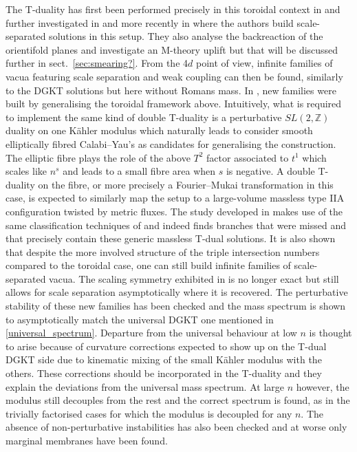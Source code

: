 \documentclass[11pt, a4paper]{article}
\newcommand{\Z}{\mathbb{Z}}
\begin{document}
The T-duality has first been performed precisely in this toroidal context in \cite{Banks:2006hg} and further investigated in \cite{Caviezel:2008ik} and more recently in \cite{Cribiori:2021djm} where the authors build scale-separated solutions in this setup. They also analyse the backreaction of the orientifold planes and investigate an M-theory uplift but that will be discussed further in sect.~\ref{sec:smearing?}. From the 4$d$ point of view, infinite families of vacua featuring scale separation and weak coupling can then be found, similarly to the DGKT solutions but here without Romans mass. In \cite{Carrasco:2023hta}, new families were built by generalising the toroidal framework above. Intuitively, what is required to implement the same kind of double T-duality is a perturbative $SL(2,\Z)$ duality on one Kähler modulus which naturally leads to consider smooth elliptically fibred Calabi--Yau's as candidates for generalising the construction. The elliptic fibre plays the role of the above $T^2$ factor associated to $t^1$ which scales like $n^s$ and leads to a small fibre area when $s$ is negative. A double T-duality on the fibre, or more precisely a Fourier--Mukai transformation in this case, is expected to similarly map the setup to a large-volume massless type IIA configuration twisted by metric fluxes. The study developed in \cite{Carrasco:2023hta} makes use of the same classification techniques of \cite{Marchesano:2020uqz} and indeed finds branches that were missed and that precisely contain these generic massless T-dual solutions. It is also shown that despite the more involved structure of the triple intersection numbers compared to the toroidal case, one can still build infinite families of scale-separated vacua. The scaling symmetry exhibited in \cite{Cribiori:2021djm} is no longer exact but still allows for scale separation asymptotically where it is recovered. The perturbative stability of these new families has been checked and the mass spectrum is shown to asymptotically match the universal DGKT one mentioned in \eqref{universal_spectrum}. Departure from the universal behaviour at low $n$ is thought to arise because of curvature corrections expected to show up on the T-dual DGKT side due to kinematic mixing of the small Kähler modulus with the others. These corrections should be incorporated in the T-duality and they explain the deviations from the universal mass spectrum. At large $n$ however, the modulus still decouples from the rest and the correct spectrum is found, as in the trivially factorised cases for which the modulus is decoupled for any $n$. The absence of non-perturbative instabilities has also been checked and at worse only marginal membranes have been found.
\end{document}
